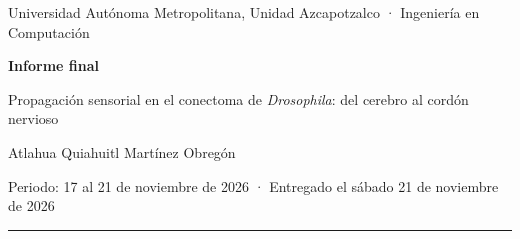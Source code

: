 \documentclass[11pt,letterpaper]{article}
\begin{document}
\begin{center}
{\small Universidad Autónoma Metropolitana, Unidad Azcapotzalco · Ingeniería en Computación\par}
\vspace{0.5cm}
{\Large\bfseries\color{tinta} Informe final\par}
\vspace{0.15cm}
{\large Propagación sensorial en el conectoma de \emph{Drosophila}: del cerebro al cordón nervioso\par}
\vspace{0.4cm}
{\normalsize Atlahua Quiahuitl Martínez Obregón\par}
{\small Periodo: 17 al 21 de noviembre de 2026 · Entregado el sábado 21 de noviembre de 2026\par}
\vspace{0.2cm}
{\color{tinta}\rule{\linewidth}{0.6pt}}
\end{center}

\begin{abstract}
\noindent Se midió en cuántos pasos llega la información de cada modalidad sensorial a cada neurona de la mosca de la fruta y a sus motoneuronas, con el modelo de recorrido probabilístico de \citet{schlegel2021}, sobre dos conectomas públicos: el cerebro de FlyWire v783 y el cerebro con cordón nervioso del BANC v888. Una implementación propia, vectorizada y validada contra \texttt{navis}, reproduce las capas publicadas por \citet{dorkenwald2024} en las 13 modalidades (Spearman de 0.971 a 0.996), pero solo con el cerebro completo, sin umbral de sinapsis y con tope de 15 pasos. Los criterios para el BANC se fijaron antes de abrir sus datos. El orden de las capas por tipo celular se conserva entre las dos moscas (Spearman de 0.964 a 0.978): H2 se cumple. En el sistema nervioso completo, los mecanosensores de cada pata llegan a las motoneuronas de su propia pata de 1.5 a 2.1 pasos antes que la modalidad de la cabeza más cercana, unas 3 capas por encima de lo que dan 10 grafos al azar con los mismos grados. Pero el criterio fijado pedía 2 pasos en las tres patas y solo la pata trasera lo alcanza: H3 no se cumple tal como se planteó. El umbral de sinapsis cambia las capas (Spearman 0.88); el tope de pasos no. El código, las figuras y los resultados están en un repositorio público (v0.2).
\end{abstract}

\end{document}

